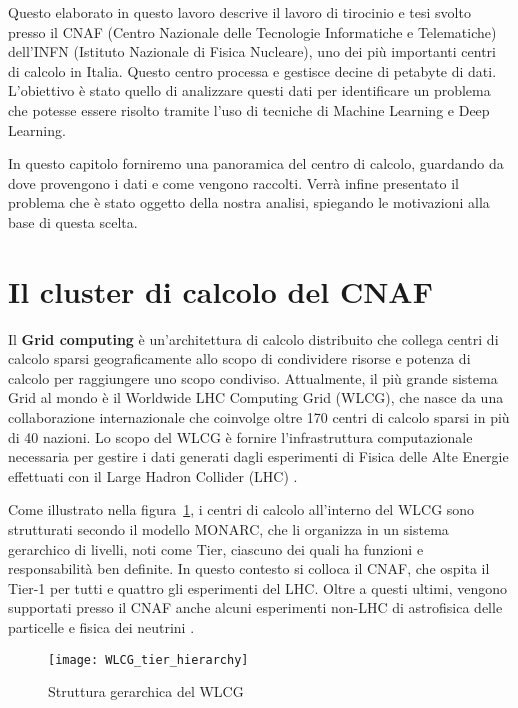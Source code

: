 Questo elaborato in questo lavoro  descrive il lavoro di tirocinio e tesi
svolto presso il CNAF (Centro Nazionale delle Tecnologie Informatiche e
Telematiche) dell'INFN (Istituto Nazionale di Fisica Nucleare), uno dei più
importanti centri di calcolo in Italia. Questo centro processa e gestisce
decine di petabyte di dati. L'obiettivo è stato quello di analizzare questi
dati per identificare un problema che potesse essere risolto tramite l'uso di
tecniche di Machine Learning e Deep Learning.

In questo capitolo forniremo una panoramica del centro di calcolo, guardando
da dove provengono i dati e come vengono raccolti. Verrà infine presentato il
problema che è stato oggetto della nostra analisi, spiegando le motivazioni
alla base di questa scelta.

\section{Il cluster di calcolo del CNAF}

Il \textbf{Grid computing} è un'architettura di calcolo distribuito che
collega centri di calcolo sparsi geograficamente allo scopo di condividere
risorse e potenza di calcolo per raggiungere uno scopo condiviso. Attualmente,
il più grande sistema Grid al mondo è il Worldwide LHC Computing Grid (WLCG),
che nasce da una collaborazione internazionale che coinvolge oltre 170 centri
di calcolo sparsi in più di 40 nazioni. Lo scopo del WLCG è fornire
l'infrastruttura computazionale necessaria per gestire i dati generati dagli
esperimenti di Fisica delle Alte Energie effettuati con il Large Hadron
Collider (LHC) \cite{WLCG2023}.

Come illustrato nella figura~\ref{fig:WLCG_tier_hierarchy}, i centri di
calcolo all'interno del WLCG sono strutturati secondo il modello MONARC, che
li organizza in un sistema gerarchico di livelli, noti come Tier, ciascuno dei
quali ha funzioni e responsabilità ben definite. In questo contesto si colloca
il CNAF, che ospita il Tier-1 per tutti e quattro gli esperimenti del LHC.
Oltre a questi ultimi, vengono supportati presso il CNAF anche alcuni
esperimenti non-LHC di astrofisica delle particelle e fisica dei neutrini
\cite{Bortolotti2012}.

\begin{figure}[ht]
    \centering
    \texttt{[image: WLCG\_tier\_hierarchy]}
    \caption{Struttura gerarchica del WLCG \protect\cite{dalpra2019}}
    \label{fig:WLCG_tier_hierarchy}
\end{figure}

